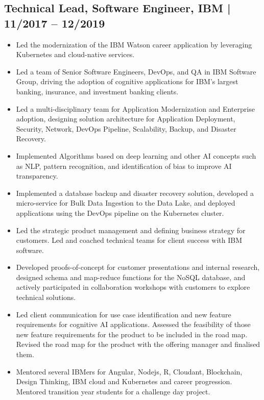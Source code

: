 \documentclass[12pt,]{scrartcl}
\begin{document}
\subsection*{Technical Lead, Software Engineer, IBM | 11/2017 -- 12/2019}
\begin{itemize}
      \item Led the modernization of the IBM Watson career application by leveraging Kubernetes and cloud-native services. 
     \item Led a team of Senior Software Engineers, DevOps, and QA in IBM Software Group, driving the adoption of cognitive applications for IBM's largest banking, insurance, and investment banking clients.
     \item Led a multi-disciplinary team for Application Modernization and Enterprise adoption, designing solution architecture for Application Deployment, Security, Network, DevOps Pipeline, Scalability, Backup, and Disaster Recovery.
     \item Implemented Algorithms based on deep learning and other AI concepts such as NLP, pattern recognition, and identification of bias to improve AI transparency. 
     \item Implemented a database backup and disaster recovery solution, developed a micro-service for Bulk Data Ingestion to the Data Lake, and deployed applications using the DevOps pipeline on the Kubernetes cluster.
     \item Led the strategic product management and defining business strategy for customers. Led and coached technical teams for client success with IBM software.
     \item Developed proofs-of-concept for customer presentations and internal research, designed schema and map-reduce functions for the NoSQL database, and actively participated in collaboration workshops with customers to explore technical solutions.
     \item Led client communication for use case identification and new feature requirements for cognitive AI applications. Assessed the feasibility of those new feature requirements for the product to be included in the road map. Revised the road map for the product with the offering manager and finalised them.
    \item Mentored several IBMers for Angular, Nodejs, R, Cloudant, Blockchain, Design Thinking, IBM cloud and Kubernetes and career progression. Mentored transition year students for a challenge day project. 
    
\end{itemize}
\end{document}
